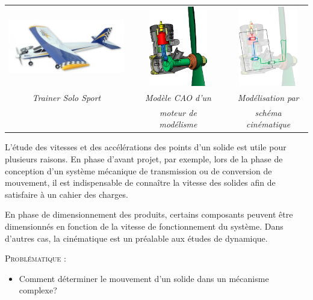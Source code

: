 \documentclass[11pt,oneside]{article}
\begin{document}
\begin{center}
\begin{tabular}{ccccc}
\includegraphics[height=2.5cm]{png/avion} &&
\includegraphics[height=3.5cm]{png/moteur_3d} && 
\includegraphics[height=3.5cm]{png/moteur_3d_sch}\\
\textit{Trainer Solo Sport \cite{cite1}} &&
\textit{Modèle CAO d'un} &&
\textit{Modélisation par}\\
 &&
\textit{moteur de modélisme \cite{cite2}} &&
\textit{schéma cinématique}\\
\end{tabular}
\end{center}

\vspace{.2cm}
L'étude des vitesses et des accélérations des points d'un solide est utile pour plusieurs raisons. En phase d'avant projet, par exemple, lors de la phase de conception d'un système mécanique de transmission ou de conversion de mouvement, il est indispensable de connaître la vitesse des solides afin de satisfaire à un cahier des charges.

En phase de dimensionnement des produits, certains composants peuvent être dimensionnés en fonction de la vitesse de fonctionnement du système. Dans d'autres cas, la cinématique est un préalable aux études de dynamique. 

\begin{prob}
\textsc{Problématique :}
\begin{itemize}
\item Comment déterminer le mouvement d'un solide dans un mécanisme complexe?
\end{itemize}
\end{prob}
\end{document}
